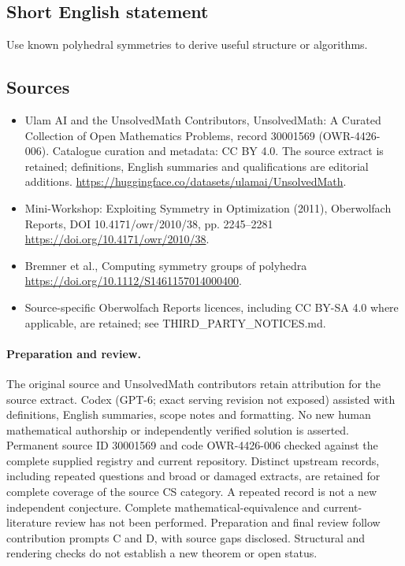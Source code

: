 \documentclass[11pt]{article}
\begin{document}
\subsection{Short English statement}
Use known polyhedral symmetries to derive useful structure or algorithms.
\subsection{Sources}
\begin{itemize}
\item[\hypertarget{source:30001569:1}{S1}] Ulam AI and the UnsolvedMath Contributors, UnsolvedMath: A Curated Collection of Open Mathematics Problems, record 30001569 (OWR-4426-006). Catalogue curation and metadata: CC BY 4.0. The source extract is retained; definitions, English summaries and qualifications are editorial additions.
\url{https://huggingface.co/datasets/ulamai/UnsolvedMath}.
\item[\hypertarget{source:30001569:2}{S2}] Mini-Workshop: Exploiting Symmetry in Optimization (2011), Oberwolfach Reports, DOI 10.4171/owr/2010/38, pp. 2245--2281
\url{https://doi.org/10.4171/owr/2010/38}.
\item[\hypertarget{source:30001569:3}{S3}] Bremner et al., Computing symmetry groups of polyhedra
\url{https://doi.org/10.1112/S1461157014000400}.
\item Source-specific Oberwolfach Reports licences, including CC BY-SA 4.0 where applicable, are retained; see THIRD\_PARTY\_NOTICES.md.
\end{itemize}
\paragraph{Preparation and review.}
The original source and UnsolvedMath contributors retain attribution for the source extract. Codex (GPT-6; exact serving revision not exposed) assisted with definitions, English summaries, scope notes and formatting. No new human mathematical authorship or independently verified solution is asserted. Permanent source ID 30001569 and code OWR-4426-006 checked against the complete supplied registry and current repository. Distinct upstream records, including repeated questions and broad or damaged extracts, are retained for complete coverage of the source CS category. A repeated record is not a new independent conjecture. Complete mathematical-equivalence and current-literature review has not been performed. Preparation and final review follow contribution prompts C and D, with source gaps disclosed. Structural and rendering checks do not establish a new theorem or open status.
\label{end:30001569}
\end{document}
